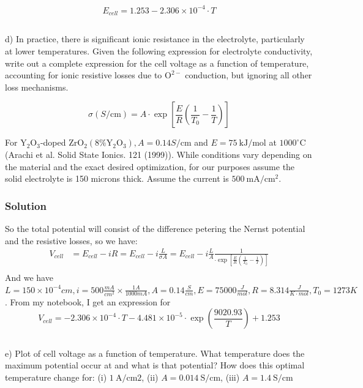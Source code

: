 \documentclass[12pt]{article}
\begin{document}
$$
E_{cell} = 1.253 - 2.306 \times 10^{-4} \cdot T
$$
\subsection{}
d) In practice, there is significant ionic resistance in the electrolyte, particularly at lower temperatures. Given the following expression for electrolyte conductivity, write out a complete expression for the cell voltage as a function of temperature, accounting for ionic resistive losses due to $\mathrm{O}^{2-}$ conduction, but ignoring all other loss mechanisms.

$$
\sigma(S / \mathrm{cm})=A \cdot \exp \left[\frac{E}{R}\left(\frac{1}{T_{0}}-\frac{1}{T}\right)\right]
$$

For $\mathrm{Y}_{2} \mathrm{O}_{3}$-doped $\mathrm{ZrO}_{2}\left(8 \% \mathrm{Y}_{2} \mathrm{O}_{3}\right), A=0.14 S / \mathrm{cm}$ and $E=75 \mathrm{~kJ} / \mathrm{mol}$ at $1000^{\circ} \mathrm{C}$ (Arachi et al. Solid State Ionics. 121 (1999)). While conditions vary depending on the material and the exact desired optimization, for our purposes assume the solid electrolyte is 150 microns thick. Assume the current is $500 \mathrm{~mA} / \mathrm{cm}^{2}$.\\
\subsubsection{Solution}
So the total potential will consist of the difference petering the Nernst potential and the resistive losses, so we have:
\begin{align}
    V_{cell} &= E_{cell} - iR = E_{cell} - i \frac{L}{\sigma A} = E_{cell} - i \frac{L}{A} \frac{1}{\cdot \exp \left[\frac{E}{R}\left(\frac{1}{T_{0}}-\frac{1}{T}\right)\right]} \\
\end{align}
And we have $L = 150 \times 10^{-4} cm, i = 500 \frac{mA}{cm^{2}}\times \frac{1 A}{1000 mA}, A = 0.14 \frac{S}{cm}, E = 75000 \frac{J}{mol}, R = 8.314 \frac{J}{K \cdot mol}, T_0 = 1273 K$. From my notebook, I get an expression for
\begin{equation}
    V_{cell} = -2.306 \times 10^{-4} \cdot T - 4.481 \times 10^{-5} \cdot \exp\left(\frac{9020.93}{T}\right) + 1.253
\end{equation}
\subsection{}
e) Plot of cell voltage as a function of temperature. What temperature does the maximum potential occur at and what is that potential? How does this optimal temperature change for: (i) $1 \mathrm{~A} / \mathrm{cm} 2$, (ii) $A=0.014 \mathrm{~S} / \mathrm{cm}$, (iii) $A=1.4 \mathrm{~S} / \mathrm{cm}$
\end{document}
